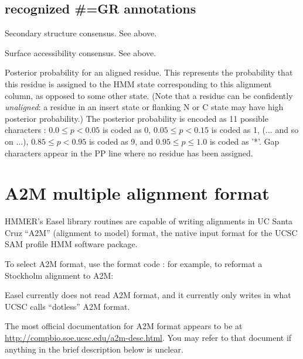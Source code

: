 \subsection{recognized \#=GR annotations}
\begin{sreitems}{}
\item [\monob{SS}]
        Secondary structure consensus. See  above.
\item [\monob{SA}]
        Surface accessibility consensus. See  above.
\item [\monob{PP}] Posterior probability for an aligned residue. This
  represents the probability that this residue is assigned to the HMM
  state corresponding to this alignment column, as opposed to some
  other state. (Note that a residue can be confidently
  \emph{unaligned}: a residue in an insert state or flanking N or C
  state may have high posterior probability.) The posterior
  probability is encoded as 11 possible characters : $0.0
  \leq p < 0.05$ is coded as 0, $0.05 \leq p < 0.15$ is coded as 1,
  (... and so on ...), $0.85 \leq p < 0.95$ is coded as 9, and $0.95
  \leq p \leq 1.0$ is coded as '*'. Gap characters appear in the PP
  line where no residue has been assigned.
\end{sreitems}



\newpage
\section{A2M multiple alignment format}


HMMER's Easel library routines are capable of writing alignments in UC
Santa Cruz ``A2M'' (alignment to model) format, the native input
format for the UCSC SAM profile HMM software package. 

To select A2M format, use the format code : for example, 
to reformat a Stockholm alignment to A2M:


Easel currently does not read A2M format, and it currently only writes
in what UCSC calls ``dotless'' A2M format.

The most official documentation for A2M format appears to be at
\url{http://compbio.soe.ucsc.edu/a2m-desc.html}. You may refer to that
document if anything in the brief description below is unclear.

